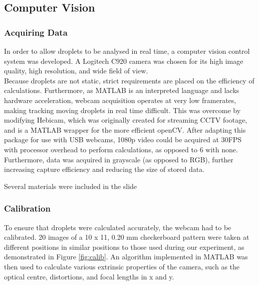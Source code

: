 \documentclass{physics_article_B}
\begin{document}
    \subsection{Computer Vision\label{sect_vision}}
        
        \subsubsection{Acquiring Data}
            In order to allow droplets to be analysed in real time, a computer vision control system was developed. A Logitech C920 camera was chosen for its high image quality, high resolution, and wide field of view. \\
            
            Because droplets are not static, strict requirements are placed on the efficiency of calculations. Furthermore, as MATLAB is an interpreted language and lacks hardware acceleration, webcam acquisition operates at very low framerates, making tracking moving droplets in real time difficult. This was overcome by modifying Hebicam\cite{HebiCam}, which was originally created for streaming CCTV footage, and is a MATLAB wrapper for the more efficient openCV. After adapting this package for use with USB webcams, 1080p video could be acquired at 30FPS with processor overhead to perform calculations, as opposed to 6 with none. Furthermore, data was acquired in grayscale (as opposed to RGB), further increasing capture efficiency and reducing the size of stored data. 
            
            Several materials were included in the slide
    
        \subsubsection{Calibration}

            To ensure that droplets were calculated accurately, the webcam had to be calibrated. 20 images of a 10 x 11, 0.20 mm checkerboard pattern were taken at different positions in similar positions to those used during our experiment, as demonstrated in Figure \ref{fig:calib}. An algorithm implemented in MATLAB\cite{CameraCalibration} was then used to calculate various extrinsic properties of the camera, such as the optical centre, distortions, and focal lengths in x and y. 
            
\end{document}
